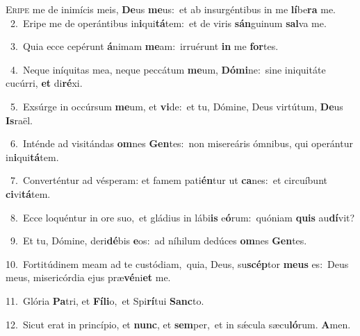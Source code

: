 \lettrine{\initial\textcolor{\initialcolor}{E}}{ripe} me de inimícis meis, \textbf{De}\-us \textbf{me}\-us:~\star et ab insurgéntibus in me \textbf{lí}\-be\textbf{ra} me.\\
{\numbfont\textcolor{\numbcolor}{~2.}}~Eripe me de operántibus in\-\textbf{i}\-qui\-\textbf{tá}\-tem:~\star et de viris \textbf{sán}\-guinum \textbf{sal}\-va me.\par
{\numbfont\textcolor{\numbcolor}{~3.}}~Quia ecce cepérunt \textbf{á}\-nimam \textbf{me}\-am:~\star irruérunt \textbf{in} me \textbf{for}\-tes.\par
{\numbfont\textcolor{\numbcolor}{~4.}}~Neque iníquitas mea, neque peccátum \textbf{me}\-um, \textbf{Dó}\-\textbf{mi}ne:~\star sine iniquitáte cucúrri, \textbf{et} di\-\textbf{ré}\-xi.\par
{\numbfont\textcolor{\numbcolor}{~5.}}~Exsúrge in occúrsum \textbf{me}\-um, et \textbf{vi}\-de:~\star et tu, Dómine, Deus virtútum, \textbf{De}\-us \textbf{Is}\-raël.\par
{\numbfont\textcolor{\numbcolor}{~6.}}~Inténde ad visitándas \textbf{om}\-nes \textbf{Gen}\-tes:~\star non misereáris ómnibus, qui operántur in\-\textbf{i}\-qui\-\textbf{tá}\-tem.\par
{\numbfont\textcolor{\numbcolor}{~7.}}~Converténtur ad vésperam: et famem pati\-\textbf{én}\-tur ut \textbf{ca}\-nes:~\star et circuíbunt \textbf{ci}\-vi\-\textbf{tá}\-tem.\par
{\numbfont\textcolor{\numbcolor}{~8.}}~Ecce loquéntur in ore suo,~\dagger et gládius in lábi\textbf{is} e\-\textbf{ó}\-rum:~\star quóniam \textbf{quis} au\-\textbf{dí}\-vit?\par
{\numbfont\textcolor{\numbcolor}{~9.}}~Et tu, Dómine, deri\-\textbf{dé}\-bis \textbf{e}\-os:~\star ad níhilum dedúces \textbf{om}\-nes \textbf{Gen}\-tes.\par
{\numbfont\textcolor{\numbcolor}{10.}}~Fortitúdinem meam ad te custódiam,~\dagger quia, Deus, su\-\textbf{scép}\-tor \textbf{me}\-\textbf{us} es:~\star Deus meus, misericórdia ejus præ\-\textbf{vé}\-ni\textbf{et} me.\par
{\numbfont\textcolor{\numbcolor}{11.}}~Glória \textbf{Pa}\-tri, et \textbf{Fí}\-\textbf{li}o,~\star et Spi\-\textbf{rí}\-tui \textbf{Sanc}\-to.\par
{\numbfont\textcolor{\numbcolor}{12.}}~Sicut erat in princípio, et \textbf{nunc}\-, et \textbf{sem}\-per,~\star et in sǽcula sæcu\-\textbf{ló}\-rum. \textbf{A}\-men.\par
